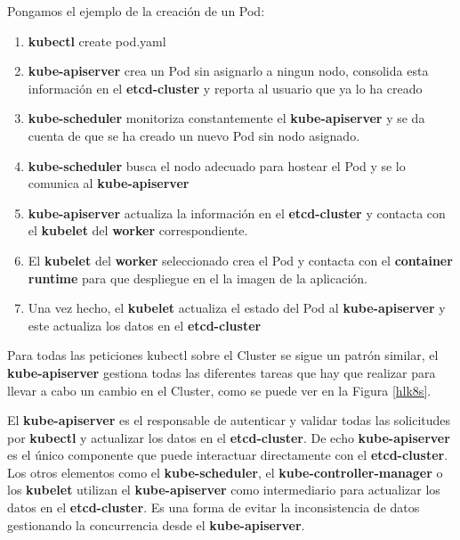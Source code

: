 \documentclass{article}
\newenvironment{blocktemplateII}[1]{%
    \tcolorbox[beamer,%
    noparskip,breakable,
    colframe=Green,%
    colbacklower=LimeGreen!75!LightGreen,%
    title=#1]}%
    {\endtcolorbox}
\begin{document}
Pongamos el ejemplo de la creación de un Pod:

\begin{enumerate}
    \item \textbf{kubectl} create pod.yaml
    \item \textbf{kube-apiserver} crea un Pod sin asignarlo a ningun nodo, consolida esta información en el \textbf{etcd-cluster} y reporta al usuario que ya lo ha creado
    \item \textbf{kube-scheduler} monitoriza constantemente el \textbf{kube-apiserver} y se da cuenta de que se ha creado un nuevo Pod sin nodo asignado.
    \item \textbf{kube-scheduler} busca el nodo adecuado para hostear el Pod y se lo comunica al \textbf{kube-apiserver}
    \item \textbf{kube-apiserver} actualiza la información en el \textbf{etcd-cluster} y contacta con el \textbf{kubelet} del \textbf{worker} correspondiente.
    \item El \textbf{kubelet} del \textbf{worker} seleccionado crea el Pod y contacta con el \textbf{container runtime} para que despliegue en el la imagen de la aplicación.
    \item Una vez hecho, el \textbf{kubelet} actualiza el estado del Pod al \textbf{kube-apiserver} y este actualiza los datos en el \textbf{etcd-cluster}
    
\end{enumerate}

Para todas las peticiones kubectl sobre el Cluster se sigue un patrón similar, el \textbf{kube-apiserver} gestiona todas las diferentes tareas que hay que realizar para llevar a cabo un cambio en el Cluster, como se puede ver en la Figura \ref{hlk8s}.



\begin{blocktemplateII}{Note}
El \textbf{kube-apiserver} es el responsable de autenticar y validar todas las solicitudes por \textbf{kubectl} y actualizar los datos en el \textbf{etcd-cluster}. De echo \textbf{kube-apiserver} es el único componente que puede interactuar directamente con el \textbf{etcd-cluster}. Los otros elementos como el \textbf{kube-scheduler}, el \textbf{kube-controller-manager} o los \textbf{kubelet} utilizan el \textbf{kube-apiserver} como intermediario para actualizar los datos en el \textbf{etcd-cluster}. Es una forma de evitar la inconsistencia de datos gestionando la concurrencia desde el \textbf{kube-apiserver}.
\end{blocktemplateII}
\end{document}
